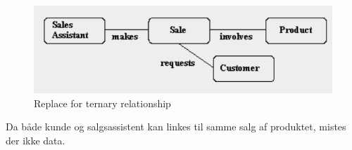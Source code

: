 \begin{enumerate}
	\begin{figure}[H]
		\centering
		\includegraphics[width=0.7\linewidth]{figs/spm1/nonTernaryRelationPNG.PNG}
		\caption{Replace for ternary relationship}
		\label{fig:nonTernaryRelationPNG}
	\end{figure}
	
	Da både kunde og salgsassistent kan linkes til samme salg af produktet, mistes der ikke data.


		
\end{enumerate}

























